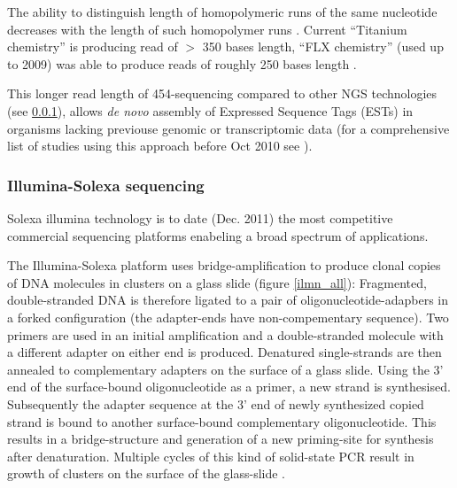 The ability to distinguish length of homopolymeric runs of the same
nucleotide decreases with the length of such homopolymer runs
\cite{pmid21685085}. Current ``Titanium chemistry'' is producing read
of $>$ 350 bases length, ``FLX chemistry'' (used up to 2009) was able
to produce reads of roughly 250 bases length \cite{pmid21514329}.

This longer read length of 454-sequencing \cite{pmid16056220} compared
to other NGS technologies (see \ref{sec:ill-seq}), allows \textit{de
  novo} assembly of Expressed Sequence Tags (ESTs) in organisms
lacking previouse genomic or transcriptomic data (for a comprehensive
list of studies using this approach before Oct 2010 see
\cite{pmid20950480}).

\subsubsection{Illumina-Solexa sequencing}
\label{sec:ill-seq}

Solexa illumina technology is to date (Dec. 2011) the most competitive
commercial sequencing platforms enabeling a broad spectrum of
applications.


The Illumina-Solexa platform uses bridge-amplification to produce
clonal copies of DNA molecules in clusters on a glass slide (figure
\ref{ilmn_all}): Fragmented, double-stranded DNA is therefore ligated to
a pair of oligonucleotide-adapbers in a forked configuration (the
adapter-ends have non-compementary sequence). Two primers are used in
an initial amplification and a double-stranded molecule with a
different adapter on either end is produced. Denatured single-strands
are then annealed to complementary adapters on the surface of a glass
slide. Using the 3' end of the surface-bound oligonucleotide as a
primer, a new strand is synthesised. Subsequently the adapter sequence
at the 3' end of newly synthesized copied strand is bound to another
surface-bound complementary oligonucleotide. This results in a
bridge-structure and generation of a new priming-site for synthesis
after denaturation. Multiple cycles of this kind of solid-state PCR
result in growth of clusters on the surface of the glass-slide
\cite{pmid18987734}.

